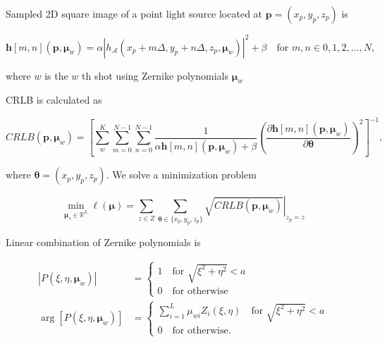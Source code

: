 \documentclass[letter, 11pt]{article}
\begin{document}
Sampled 2D square image of a point light source located at $\mathbf{p} = (x_{p}, y_{p}, z_{p})$ is

\begin{equation}
	\mathbf{h}[m, n](\mathbf{p}, \boldsymbol{\mu}_{w}) = \alpha \left|   h_{\mathcal{A}} (x_{p} + m \Delta,  y_{p} + n \Delta, z_{p}, 
	\boldsymbol{\mu}_{w})    \right|^{2} + \beta \quad  \text{for } m, n \in {0, 1, 2, \ldots, N},
\end{equation}

\noindent where $w$ is the $w$ th  shot using Zernike polynomials $\boldsymbol{\mu}_{w}$

CRLB is calculated as

\begin{equation}
	CRLB(\mathbf{p}, \boldsymbol{\mu}_{w}) = \left[  \sum_{w}^{K}  \sum_{m=0}^{N-1} \sum_{n=0}^{N-1}
	\frac{1}{\alpha \mathbf{h} [m, n] (\mathbf{p}, \boldsymbol{\mu}_{w}) + \beta}	    
	\left(  \frac{\partial  \mathbf{h}[m, n] (\mathbf{p}, \boldsymbol{\mu}_{w})}{\partial \boldsymbol{\theta}} \right) ^{2}
	\right]^{-1},
\end{equation}

\noindent
where $\boldsymbol{\theta} = (x_{p}, y_{p}, z_{p})$. 
We solve a minimization problem


\begin{equation}
	\min_{\boldsymbol{\mu}_{s} \in \mathbb{R}^{L}} \ell (\boldsymbol{\mu}) = 
	\sum_{z \in Z} \sum_{\boldsymbol{\theta} \in \{ x_{p}, y_{p}, z_{p}\} }
	\left. \sqrt{CRLB(\mathbf{p}, \boldsymbol{\mu}_{w})}
	\right|_{z_{p} = z}
\end{equation}

\noindent
Linear combination of Zernike polynomials is

\begin{align*}
	| P(\xi, \eta, \boldsymbol{\mu}_{w}) | &=
		\begin{cases}
			1 \quad \text{for } \sqrt{\xi^{2} + \eta^{2}} < a \\
			0 \quad \text{for otherwise}
	        \end{cases} \\
	        \arg [ P(\xi, \eta, \boldsymbol{\mu}_{w}) ] &=
		        \begin{cases}
	        		\sum_{i = 1}^{L} \mu_{wi} Z_{i} (\xi, \eta) \quad \text{for } \sqrt{\xi^{2} + \eta^{2}} < a \\
			0 \quad \text{for otherwise}.
	        \end{cases}
\end{align*}
\end{document}
